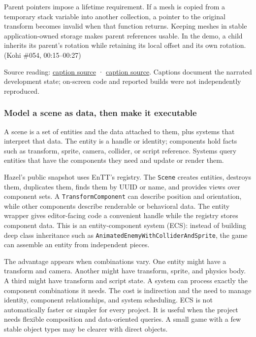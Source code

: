 Parent pointers impose a lifetime requirement. If a mesh is copied from a temporary stack variable into another collection, a pointer to the original transform becomes invalid when that function returns. Keeping meshes in stable application-owned storage makes parent references usable. In the demo, a child inherits its parent's rotation while retaining its local offset and its own rotation. (Kohi \#054, 00:15--00:27)

Source reading: \href{https://www.youtube.com/watch?v=73KBx90cD0M}{caption source} · \href{https://www.youtube.com/watch?v=r2535XLneiI}{caption source}. Captions document the narrated development state; on-screen code and reported builds were not independently reproduced.

\subsubsection{Model a scene as data, then make it executable}\label{model-a-scene-as-data-then-make-it-executable}

A scene is a set of entities and the data attached to them, plus systems that interpret that data. The entity is a handle or identity; components hold facts such as transform, sprite, camera, collider, or script reference. Systems query entities that have the components they need and update or render them.

Hazel's public snapshot uses EnTT's registry. The \texttt{Scene} creates entities, destroys them, duplicates them, finds them by UUID or name, and provides views over component sets. A \texttt{TransformComponent} can describe position and orientation, while other components describe renderable or behavioral data. The entity wrapper gives editor-facing code a convenient handle while the registry stores component data. This is an entity-component system (ECS): instead of building deep class inheritance such as \texttt{AnimatedEnemyWithColliderAndSprite}, the game can assemble an entity from independent pieces.

The advantage appears when combinations vary. One entity might have a transform and camera. Another might have transform, sprite, and physics body. A third might have transform and script state. A system can process exactly the component combinations it needs. The cost is indirection and the need to manage identity, component relationships, and system scheduling. ECS is not automatically faster or simpler for every project. It is useful when the project needs flexible composition and data-oriented queries. A small game with a few stable object types may be clearer with direct objects.

